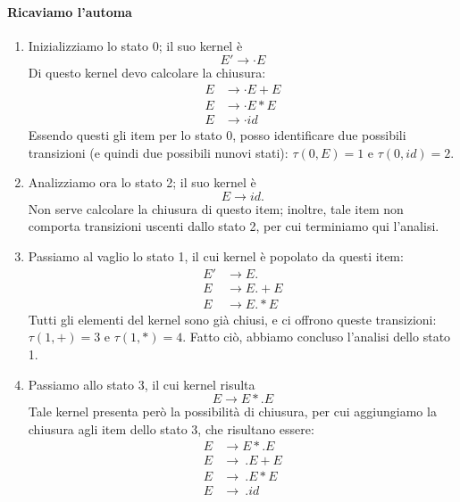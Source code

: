 \documentclass[class=book, crop=false, oneside, 12pt]{standalone}
\begin{document}
\paragraph{Ricaviamo l'automa}
\begin{enumerate}
    \item Inizializziamo lo stato 0; il suo kernel è 
    \begin{equation*}
        E' \to \cdot E
    \end{equation*}
    Di questo kernel devo calcolare la chiusura:
    \begin{align*}
        E &\to \cdot E+E \\
        E &\to \cdot E*E \\
        E &\to \cdot id
    \end{align*}
    Essendo questi gli item per lo stato 0, posso identificare due possibili transizioni (e quindi due possibili nunovi stati): \(\tau(0,E)=1 \textrm{ e } \tau(0,id)=2\).
    \item Analizziamo ora lo stato 2; il suo kernel è 
    \begin{equation*}
        E \to id.    
    \end{equation*}
    Non serve calcolare la chiusura di questo item; inoltre, tale item non comporta transizioni uscenti dallo stato 2, per cui terminiamo qui l'analisi.
    \item Passiamo al vaglio lo stato 1, il cui kernel è popolato da questi item:
    \begin{align*}
        E' &\to E.\\
        E  &\to E.+E \\
        E  &\to E.*E
    \end{align*}
    Tutti gli elementi del kernel sono già chiusi, e ci offrono queste transizioni: \(\tau(1,+)=3 \textrm{ e } \tau(1,*)=4\). Fatto ciò, abbiamo concluso l'analisi dello stato 1.
    \item Passiamo allo stato 3, il cui kernel risulta
    \begin{equation*}
        E \to E*.E
    \end{equation*}
    Tale kernel presenta però la possibilità di chiusura, per cui aggiungiamo la chiusura agli item dello stato 3, che risultano essere:
    \begin{align*}
        E &\to E*.E \\
        E &\to\ .E+E \\
        E &\to\ .E*E \\
        E &\to\ .id
    \end{align*}

\end{enumerate}
\end{document}
